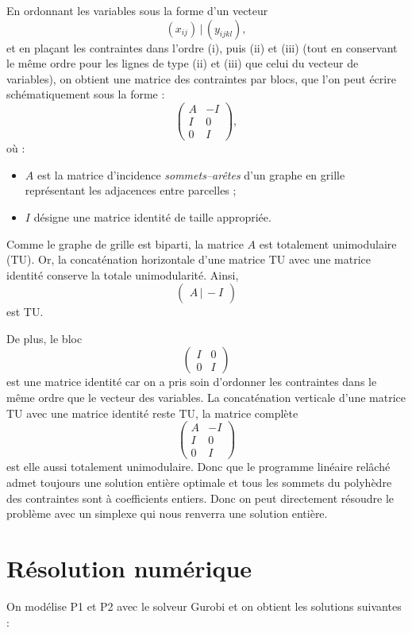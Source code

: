 \documentclass[a4paper,11pt]{article}
\begin{document}
En ordonnant les variables sous la forme d’un vecteur
\[
(x_{ij}) \, | \, (y_{ijkl}),
\]
et en plaçant les contraintes dans l’ordre (i), puis (ii) et (iii) (tout en conservant le même ordre pour les lignes de type (ii) et (iii) que celui du vecteur de variables), on obtient une matrice des contraintes par blocs, que l’on peut écrire schématiquement sous la forme :
\[
\begin{pmatrix}
A & -I \\
I & 0 \\
0 & I
\end{pmatrix},
\]
où :
\begin{itemize}
  \item \(A\) est la matrice d’incidence \emph{sommets–arêtes} d’un graphe en grille représentant les adjacences entre parcelles ;
  \item \(I\) désigne une matrice identité de taille appropriée.
\end{itemize}

Comme le graphe de grille est biparti, la matrice \(A\) est totalement unimodulaire (TU).  
Or, la concaténation horizontale d’une matrice TU avec une matrice identité conserve la totale unimodularité.  
Ainsi,
\[
\begin{pmatrix} A \,|\, -I \end{pmatrix}
\]
est TU.

De plus, le bloc
\[
\begin{pmatrix}
I & 0 \\
0 & I
\end{pmatrix}
\]
est une matrice identité car on a pris soin d'ordonner les contraintes dans le même ordre que le vecteur des variables. 
La concaténation verticale d’une matrice TU avec une matrice identité reste TU,  
la matrice complète
\[
\begin{pmatrix}
A & -I \\
I & 0 \\
0 & I
\end{pmatrix}
\]
est elle aussi totalement unimodulaire.
Donc que le programme linéaire relâché admet toujours une solution entière optimale et tous les sommets du polyhèdre des contraintes sont à coefficients entiers.
Donc on peut directement résoudre le problème avec un simplexe qui nous renverra une solution entière.

\section{Résolution numérique}
On modélise P1 et P2 avec le solveur Gurobi et on obtient les solutions suivantes :
\end{document}
